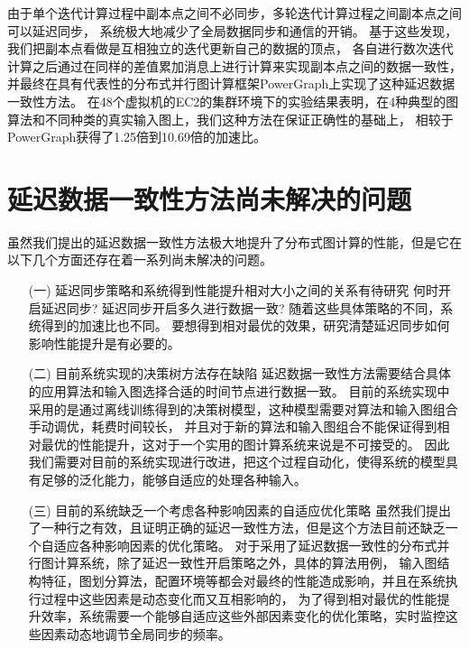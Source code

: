 由于单个迭代计算过程中副本点之间不必同步，多轮迭代计算过程之间副本点之间可以延迟同步，
系统极大地减少了全局数据同步和通信的开销。
基于这些发现，我们把副本点看做是互相独立的迭代更新自己的数据的顶点，
  各自进行数次迭代计算之后通过在同样的差值累加消息上进行计算来实现副本点之间的数据一致性，
并最终在具有代表性的分布式并行图计算框架PowerGraph\cite{Gonzalez@OSDI12}上实现了这种延迟数据一致性方法。
在48个虚拟机的EC2的集群环境下的实验结果表明，在4种典型的图算法和不同种类的真实输入图上，我们这种方法在保证正确性的基础上，
相较于PowerGraph获得了1.25倍到10.69倍的加速比。


\section{延迟数据一致性方法尚未解决的问题}
虽然我们提出的延迟数据一致性方法极大地提升了分布式图计算的性能，但是它在以下几个方面还存在着一系列尚未解决的问题。    
\begin{enumerate}      
  \item[(一)] 延迟同步策略和系统得到性能提升相对大小之间的关系有待研究 \newline\indent
    何时开启延迟同步? 延迟同步开启多久进行数据一致? 
    随着这些具体策略的不同，系统得到的加速比也不同。
    要想得到相对最优的效果，研究清楚延迟同步如何影响性能提升是有必要的。

  \item[(二)] 目前系统实现的决策树方法存在缺陷 \newline\indent
    延迟数据一致性方法需要结合具体的应用算法和输入图选择合适的时间节点进行数据一致。
    目前的系统实现中采用的是通过离线训练得到的决策树模型，这种模型需要对算法和输入图组合手动调优，耗费时间较长，
    并且对于新的算法和输入图组合不能保证得到相对最优的性能提升，这对于一个实用的图计算系统来说是不可接受的。
    因此我们需要对目前的系统实现进行改进，把这个过程自动化，使得系统的模型具有足够的泛化能力，能够自适应的处理各种输入。          

  \item[(三)] 目前的系统缺乏一个考虑各种影响因素的自适应优化策略 \newline\indent
    虽然我们提出了一种行之有效，且证明正确的延迟一致性方法，但是这个方法目前还缺乏一个自适应各种影响因素的优化策略。
    对于采用了延迟数据一致性的分布式并行图计算系统，除了延迟一致性开启策略之外，具体的算法用例，
    输入图结构特征，图划分算法，配置环境等都会对最终的性能造成影响，并且在系统执行过程中这些因素是动态变化而又互相影响的，
    为了得到相对最优的性能提升效率，系统需要一个能够自适应这些外部因素变化的优化策略，实时监控这些因素动态地调节全局同步的频率。          
\end{enumerate}
